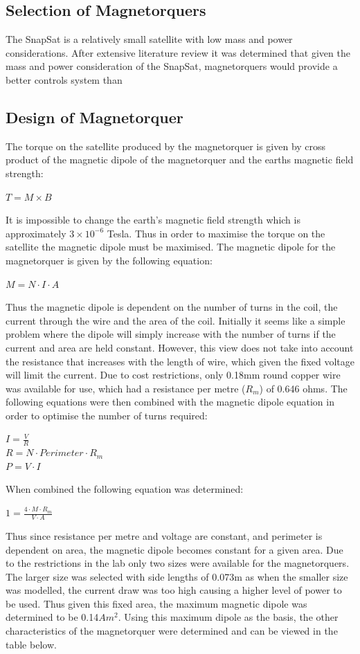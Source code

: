 \subsection{Selection of Magnetorquers}
The SnapSat is a relatively small satellite with low mass and power considerations.
After extensive literature review it was determined that given the mass and power consideration of the SnapSat, magnetorquers would provide a better controls system than 

\subsection{Design of Magnetorquer}
The torque on the satellite produced by the magnetorquer is given by cross product of the magnetic dipole of the magnetorquer and the earths magnetic field strength: 
\begin{center}
$T = M \times B$
\end{center}
It is impossible to change the earth's magnetic field strength which is approximately $3 \times 10^{-6}$ Tesla.  Thus in order to maximise the torque on the satellite the magnetic dipole must be maximised. The magnetic dipole for the magnetorquer is given by the following equation:
\begin{center}
$M = N \cdot I \cdot A$
\end{center}
Thus the magnetic dipole is dependent on the number of turns in the coil, the current through the wire and the area of the coil.  Initially it seems like a simple problem where the dipole will simply increase with the number of turns if the current and area are held constant.  However, this view does not take into account the resistance that increases with the length of wire, which given the fixed voltage will limit the current.  Due to cost restrictions, only 0.18mm round copper wire was available for use, which had a resistance per metre ($R_m$) of 0.646 ohms.  The following equations were then combined with the magnetic dipole equation in order to optimise the number of turns required:
\begin{center}
$I = \frac{V}{R}$\vspace{2mm}\\
$R = N \cdot Perimeter \cdot R_m$ \vspace{2mm}\\
$P = V \cdot I$
\end{center}
When combined the following equation was determined:
\begin{center}
$1 = \frac{4 \cdot M \cdot R_m}{V \cdot A}$
\end{center}
Thus since resistance per metre and voltage are constant, and perimeter is dependent on area, the magnetic dipole becomes constant for a given area.  Due to the restrictions in the lab only two sizes were available for the magnetorquers. The larger size was selected with side lengths of 0.073m as when the smaller size was modelled, the current draw was too high causing a higher level of power to be used.  Thus given this fixed area, the maximum magnetic dipole was determined to be  0.14$Am^2$.  Using this maximum dipole as the basis, the other characteristics of the magnetorquer were determined and can be viewed in the table below.




